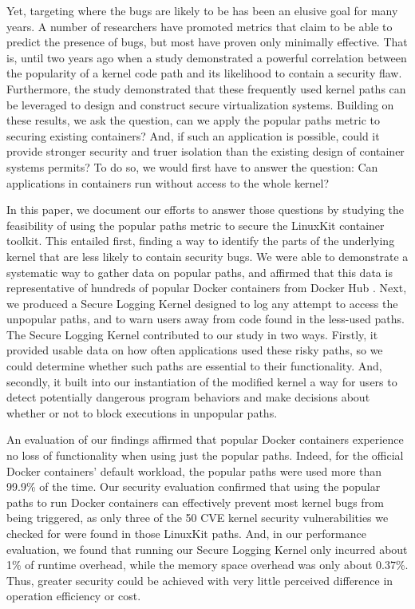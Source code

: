 Yet, targeting where the bugs are likely to be has been an elusive goal for many years. 
A number of researchers have promoted metrics \cite{Chou, Ozment} that claim to be able to predict the presence of bugs, but most have proven only minimally effective. 
That is, until two years ago when a study \cite{Lock-in-Pop} demonstrated a powerful correlation between the popularity of a kernel code path and its likelihood to contain a security flaw. 
Furthermore, the study \cite{Lock-in-Pop} demonstrated that these frequently used kernel paths can be leveraged to design and construct secure virtualization systems. 
Building on these results, we ask the question, can we apply the popular paths metric to  securing existing containers? 
And, if such an application is possible, could it provide stronger security and truer isolation than the existing design of container systems permits? 
To do so, we would first have to answer the question: Can applications in containers run without access to the whole kernel?

In this paper, we document our efforts to answer those questions by studying the feasibility of using the popular paths metric to secure the LinuxKit container toolkit. 
This entailed first, finding a way to identify the parts of the underlying kernel that are less likely to contain security bugs. We were able to demonstrate a systematic way to gather data on popular paths, 
and affirmed that this data is representative of hundreds of popular Docker containers from Docker Hub \cite{DockerHub}. 
Next, we produced a Secure Logging Kernel designed to log any attempt to access the unpopular paths, and to warn users away from code found in the less-used paths. 
The Secure Logging Kernel contributed to our study in two ways. Firstly, it provided usable data on how often applications used these risky paths, 
so we could determine whether such paths are essential to their functionality. 
And, secondly, it built into our instantiation of the modified kernel a way for users to detect potentially dangerous program behaviors and make decisions about whether or not to block executions in unpopular paths. 

An evaluation of our findings affirmed that popular Docker containers experience no loss of functionality when using just the popular paths. 
Indeed, for the official Docker containers’ default workload, the popular paths were used more than 99.9\% of the time. 
Our security evaluation confirmed that using the popular paths to run Docker containers can effectively prevent most kernel bugs from being triggered, 
as only three of the 50 CVE kernel security vulnerabilities we checked for were found in those LinuxKit paths. 
And, in our performance evaluation, we found that running our Secure Logging Kernel only incurred about 1\% of runtime overhead, while the memory space overhead was only about 0.37\%. 
Thus, greater security could be achieved with very little perceived difference in operation efficiency or cost. 

